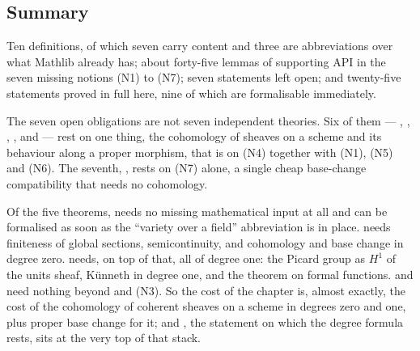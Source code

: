 \subsection*{Summary}

Ten definitions, of which seven carry content and three are abbreviations over
what Mathlib already has; about forty-five lemmas of supporting API in the
seven missing notions (N1) to (N7); seven statements left open; and
twenty-five statements proved in full here, nine of which are formalisable
immediately.

The seven open obligations are not seven independent theories.  Six of them ---
, ,
, ,
 and  --- rest on
one thing, the cohomology of sheaves on a scheme and its behaviour along a
proper morphism, that is on (N4) together with (N1), (N5) and (N6).  The
seventh, , rests on (N7)
alone, a single cheap base-change compatibility that needs no cohomology.

Of the five theorems,  needs no missing mathematical
input at all and can be formalised as soon as the ``variety over a field''
abbreviation is in place.   needs finiteness of global
sections, semicontinuity, and cohomology and base change in degree zero.
 needs, on top of that, all of degree one: the Picard group
as $H^1$ of the units sheaf, K\"unneth in degree one, and the theorem on formal
functions.   and  need
nothing beyond  and (N3).  So the cost of the chapter is,
almost exactly, the cost of the cohomology of coherent sheaves on a scheme in
degrees zero and one, plus proper base change for it; and
, the statement on which the degree formula
 rests, sits at the very top of that stack.

